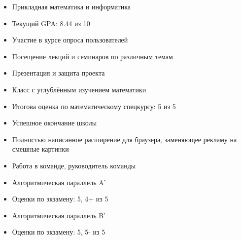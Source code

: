 \documentclass[10pt,a4paper,ragged2e]{maltacv}
\begin{document}
\medskip
\begin{multicols}{2}

  \begin{itemize}
      \item Прикладная математика и информатика
      \item Текущий GPA: 8.44 из 10
  \end{itemize}

  \begin{itemize}
      \item Участие в курсе опроса пользователей
      \item Посещение лекций и семинаров по различным темам
      \item Презентация и защита проекта
  \end{itemize}
  
  \begin{itemize}
      \item Класс с углублённым изучением математики
      \item Итогова оценка по математическому спецкурсу: 5 из 5
  \end{itemize}
\columnbreak
  
  \begin{itemize}
        \item Успешное окончание школы
        \item Полностью написанное расширение для браузера, заменяющее рекламу на смешные картинки
        \item Работа в команде, руководитель команды
  \end{itemize}
  
  
  \begin{itemize}
        \item Алгоритмическая параллель A'
        \item Оценки по экзамену: 5, 4+ из 5
  \end{itemize}
  

  
  
  \begin{itemize}
        \item Алгоритмическая параллель B'
        \item Оценки по экзамену: 5, 5- из 5
  \end{itemize}
  
  
\end{multicols}
\end{document}
